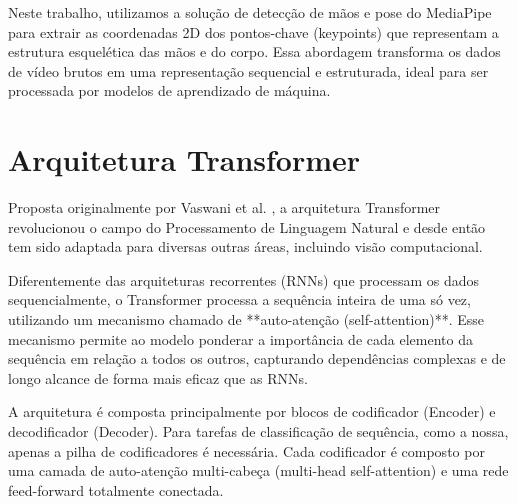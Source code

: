 \documentclass[
	a4paper,      %
	12pt,         %
	english,      %
	oneside,      %
	openany       %
]{abntex2}
\begin{document}
Neste trabalho, utilizamos a solução de detecção de mãos e pose do MediaPipe para extrair as coordenadas 2D dos pontos-chave (keypoints) que representam a estrutura esquelética das mãos e do corpo. Essa abordagem transforma os dados de vídeo brutos em uma representação sequencial e estruturada, ideal para ser processada por modelos de aprendizado de máquina.

\section{Arquitetura Transformer}
Proposta originalmente por Vaswani et al. \cite{vaswani2017attention}, a arquitetura Transformer revolucionou o campo do Processamento de Linguagem Natural e desde então tem sido adaptada para diversas outras áreas, incluindo visão computacional.

Diferentemente das arquiteturas recorrentes (RNNs) que processam os dados sequencialmente, o Transformer processa a sequência inteira de uma só vez, utilizando um mecanismo chamado de **auto-atenção (self-attention)**. Esse mecanismo permite ao modelo ponderar a importância de cada elemento da sequência em relação a todos os outros, capturando dependências complexas e de longo alcance de forma mais eficaz que as RNNs.

A arquitetura é composta principalmente por blocos de codificador (Encoder) e decodificador (Decoder). Para tarefas de classificação de sequência, como a nossa, apenas a pilha de codificadores é necessária. Cada codificador é composto por uma camada de auto-atenção multi-cabeça (multi-head self-attention) e uma rede feed-forward totalmente conectada.

\postextual


\end{document}
